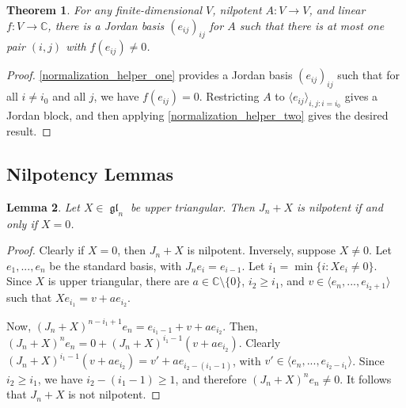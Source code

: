 \documentclass[12pt,psamsfonts]{article}
\DeclareMathOperator{\gl}{\mathfrak{gl}}
\newtheorem{theorem}{Theorem}[section]
\newtheorem{lemma}[theorem]{Lemma}
\begin{document}
\begin{theorem}\label{normalization}
    For any finite-dimensional \(V\), nilpotent \(A : V \to V\), and linear \(f : V \to \mathbb{C}\), there is a Jordan basis \((e_{ij})_{ij}\) for \(A\) such that there is at most one pair \((i, j)\) with \(f(e_{ij}) \neq 0\).
\end{theorem}
\begin{proof}
    \cref{normalization_helper_one} provides a Jordan basis \((e_{ij})_{ij}\) such that for all \(i \neq i_0\) and all \(j\), we have \(f(e_{ij}) = 0\).
    Restricting \(A\) to \(\langle e_{ij}\rangle_{i,j : i = i_0}\) gives a Jordan block, and then applying \cref{normalization_helper_two} gives the desired result.
\end{proof}

\subsection{Nilpotency Lemmas}
\begin{lemma}\label{upper_triangle_zero}
    Let \(X \in \gl_n\) be upper triangular.
    Then \(J_n + X\) is nilpotent if and only if \(X = 0\).
\end{lemma}
\begin{proof}
    Clearly if \(X = 0\), then \(J_n + X\) is nilpotent.
    Inversely, suppose \(X \neq 0\).
    Let \(e_1, ..., e_n\) be the standard basis, with \(J_n e_i = e_{i - 1}\).
    Let \(i_1 = \min\{i : Xe_i \neq 0\}\).
    Since \(X\) is upper triangular, there are \(a \in \mathbb{C} \setminus \{0\}\), \(i_2 \geq i_1\), and \(v \in \langle e_n, ..., e_{i_2 + 1}\rangle\) such that \(X e_{i_1} = v + ae_{i_2}\).
    \par Now, \((J_n + X)^{n - i_1 + 1} e_n = e_{i_1 - 1} + v + ae_{i_2}\).
    Then, \((J_n + X)^n e_n = 0 + (J_n + X)^{i_1 - 1} (v + ae_{i_2})\).
    Clearly \((J_n + X)^{i_1 - 1} (v + ae_{i_2}) = v' + ae_{i_2 - (i_1 - 1)}\), with \(v' \in \langle e_n, ..., e_{i_2 - i_1} \rangle\).
    Since \(i_2 \geq i_1\), we have \(i_2 - (i_1 - 1) \geq 1\), and therefore \((J_n + X)^n e_n \neq 0\).
    It follows that \(J_n + X\) is not nilpotent.
\end{proof}
\end{document}
